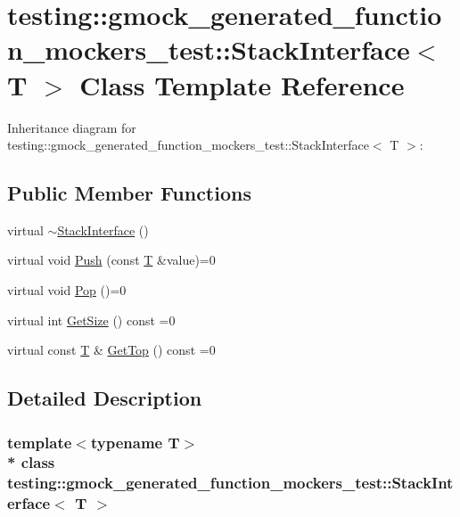 \hypertarget{classtesting_1_1gmock__generated__function__mockers__test_1_1_stack_interface}{}\section{testing\+:\+:gmock\+\_\+generated\+\_\+function\+\_\+mockers\+\_\+test\+:\+:Stack\+Interface$<$ T $>$ Class Template Reference}
\label{classtesting_1_1gmock__generated__function__mockers__test_1_1_stack_interface}


Inheritance diagram for testing\+:\+:gmock\+\_\+generated\+\_\+function\+\_\+mockers\+\_\+test\+:\+:Stack\+Interface$<$ T $>$\+:
\subsection*{Public Member Functions}
\begin{DoxyCompactItemize}
\item 
virtual \hyperlink{classtesting_1_1gmock__generated__function__mockers__test_1_1_stack_interface_a87b83db3e9cb1c986d6b0649b37cfa7c}{$\sim$\+Stack\+Interface} ()
\item 
virtual void \hyperlink{classtesting_1_1gmock__generated__function__mockers__test_1_1_stack_interface_a49448f6195021fee947d37b80b6e5d30}{Push} (const \hyperlink{functions__7_8js_adf1f3edb9115acb0a1e04209b7a9937b}{T} \&value)=0
\item 
virtual void \hyperlink{classtesting_1_1gmock__generated__function__mockers__test_1_1_stack_interface_a1a6646d1d9febe90c607b9b3e4539b67}{Pop} ()=0
\item 
virtual int \hyperlink{classtesting_1_1gmock__generated__function__mockers__test_1_1_stack_interface_a537ec8647a2333f50e5f923a85b90eba}{Get\+Size} () const =0
\item 
virtual const \hyperlink{functions__7_8js_adf1f3edb9115acb0a1e04209b7a9937b}{T} \& \hyperlink{classtesting_1_1gmock__generated__function__mockers__test_1_1_stack_interface_af36e32b9ae568100363466d1ebf95364}{Get\+Top} () const =0
\end{DoxyCompactItemize}


\subsection{Detailed Description}
\subsubsection*{template$<$typename T$>$\\*
class testing\+::gmock\+\_\+generated\+\_\+function\+\_\+mockers\+\_\+test\+::\+Stack\+Interface$<$ T $>$}



